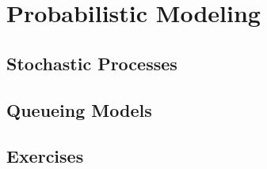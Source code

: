 \chapter{Probabilistic Modeling}

\section{Stochastic Processes}

\section{Queueing Models}

\section{Exercises}
